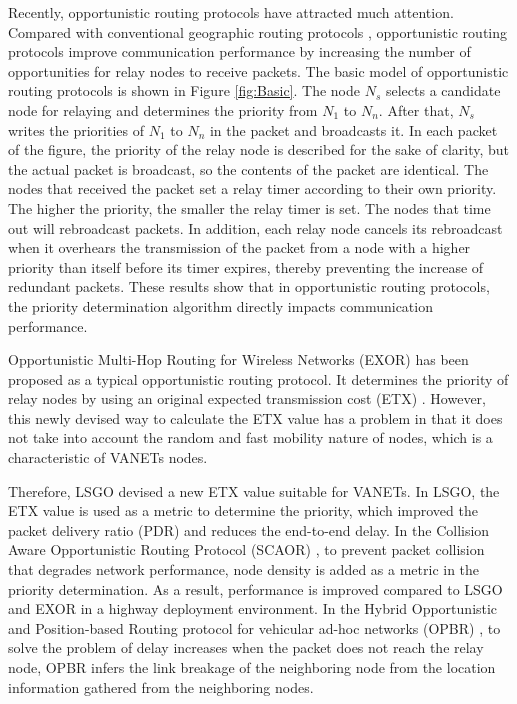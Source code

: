 \documentclass[conference]{IEEEtran}
\begin{document}
Recently, opportunistic routing protocols have attracted much attention. Compared with conventional geographic routing protocols \cite{6}, opportunistic routing protocols improve communication performance by increasing the number of opportunities for relay nodes to receive packets. The basic model of opportunistic routing protocols is shown in Figure \ref{fig:Basic}.
The node $N_{s}$ selects a candidate node for relaying and determines the priority from $N_{1}$ to $N_{n}$. After that, $N_{s}$ writes the priorities of $N_{1}$ to $N_{n}$ in the packet and broadcasts it. 
In each packet of the figure, the priority of the relay node is described for the sake of clarity, but the actual packet is broadcast, so the contents of the packet are identical. 
The nodes that received the packet set a relay timer according to their own priority.
The higher the priority, the smaller the relay timer is set.
The nodes that time out will rebroadcast packets.
In addition, each relay node cancels its rebroadcast when it overhears the transmission of the packet from a node with a higher priority than itself
before its timer expires, thereby preventing the increase of redundant packets.
These results show that in opportunistic routing protocols, the priority determination algorithm directly impacts  communication performance.


Opportunistic Multi-Hop Routing for Wireless
Networks (EXOR) \cite{16} has been proposed as a typical opportunistic routing protocol. It determines the priority of relay nodes by using an original expected transmission cost (ETX) \cite{21}. However, this newly devised way to calculate the ETX value has a problem in that it does not take into account the random and fast mobility nature of nodes, which is a characteristic of VANETs nodes.\par


Therefore, LSGO devised a new ETX value suitable for VANETs. In LSGO, the ETX value is used as a metric to determine the priority, which improved the packet delivery ratio (PDR) and reduces the end-to-end delay.
In the Collision Aware Opportunistic Routing Protocol (SCAOR) \cite{22}, to prevent  packet collision that degrades network performance, node density is added as a metric in the priority determination. 
As a result, performance is improved compared to LSGO and EXOR in a highway deployment environment. 
In the Hybrid Opportunistic and Position-based Routing protocol for vehicular 
ad-hoc networks (OPBR) \cite{23}, to solve the problem of delay increases when the packet does not reach the relay node, OPBR infers the link breakage of the neighboring node from the location information gathered from the neighboring nodes.
\end{document}
